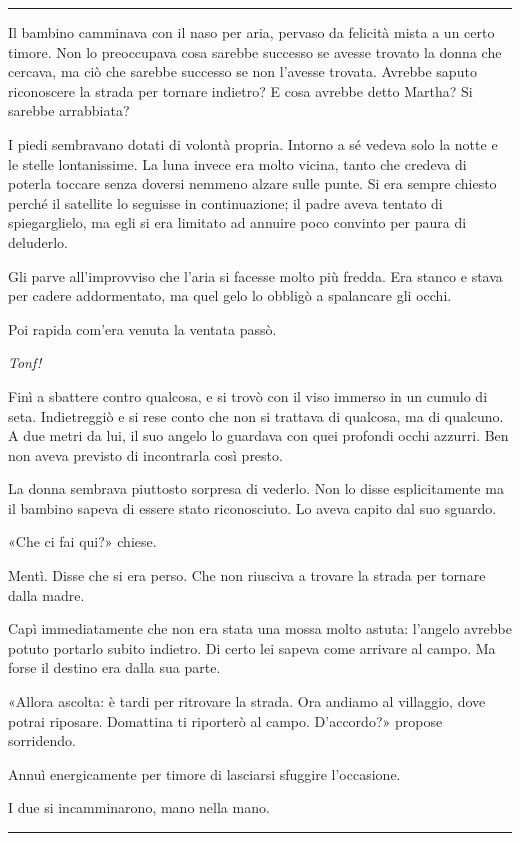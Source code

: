\documentclass[a4paper,10pt]{memoir}
\begin{document}
\plainbreak{1}

Il bambino camminava con il naso per aria, pervaso da felicità mista a un certo timore. Non lo preoccupava cosa sarebbe
successo se avesse trovato la donna che cercava, ma ciò che sarebbe successo se non l'avesse trovata. Avrebbe saputo
riconoscere la strada per tornare indietro? E cosa avrebbe detto Martha? Si sarebbe arrabbiata?

I piedi sembravano dotati di volontà propria. Intorno a sé vedeva solo la notte e le stelle lontanissime. La luna invece
era molto vicina, tanto che credeva di poterla toccare senza doversi nemmeno alzare sulle punte. Si era sempre chiesto
perché il satellite lo seguisse in continuazione; il padre aveva tentato di spiegarglielo, ma egli si era limitato ad
annuire poco convinto per paura di deluderlo.

Gli parve all'improvviso che l'aria si facesse molto più fredda. Era stanco e stava per cadere addormentato, ma quel
gelo lo obbligò a spalancare gli occhi.

Poi rapida com'era venuta la ventata passò.

\emph{Tonf!}

Finì a sbattere contro qualcosa, e si trovò con il viso immerso in un cumulo di seta. Indietreggiò e si rese conto che
non si trattava di qualcosa, ma di qualcuno. A due metri da lui, il suo angelo lo guardava con quei profondi occhi
azzurri. Ben non aveva previsto di incontrarla così presto.

La donna sembrava piuttosto sorpresa di vederlo. Non lo disse esplicitamente ma il bambino sapeva di essere stato
riconosciuto. Lo aveva capito dal suo sguardo.

«Che ci fai qui?» chiese.

Mentì. Disse che si era perso. Che non riusciva a trovare la strada per tornare dalla madre.

Capì immediatamente che non era stata una mossa molto astuta: l'angelo avrebbe potuto portarlo subito indietro. Di certo
lei sapeva come arrivare al campo. Ma forse il destino era dalla sua parte.

«Allora ascolta: è tardi per ritrovare la strada. Ora andiamo al villaggio, dove potrai riposare. Domattina ti riporterò
al campo. D'accordo?» propose sorridendo.

Annuì energicamente per timore di lasciarsi sfuggire l'occasione.

I due si incamminarono, mano nella mano.

\plainbreak{1}
\end{document}
